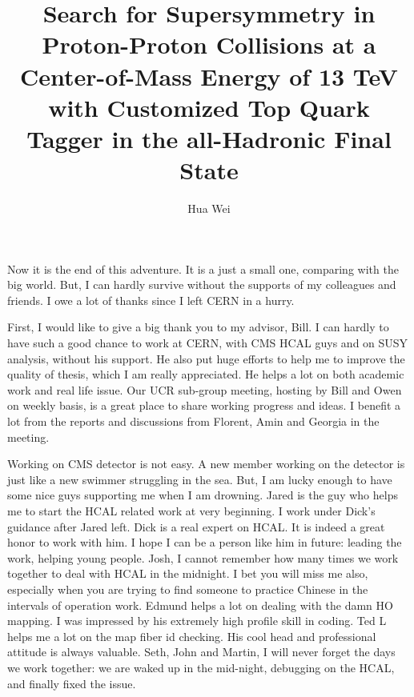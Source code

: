 \documentclass[oneside,final,letterpaper]{ucr}
\begin{document}

\title{Search for Supersymmetry in Proton-Proton Collisions at a Center-of-Mass Energy of 13 TeV with Customized Top Quark Tagger in the all-Hadronic Final State}
\author{Hua Wei}

\maketitle
\copyrightpage{}
\approvalpage{}

\begin{frontmatter}

\begin{acknowledgements}
Now it is the end of this adventure. It is a just a small one, comparing with the big world. But, I can hardly survive without the supports of my colleagues and friends. I owe a lot of thanks since I left CERN in a hurry. 

First, I would like to give a big thank you to my advisor, Bill. I can hardly to have such a good chance to work at CERN, with CMS HCAL guys and on SUSY analysis, without his support. He also put huge efforts to help me to improve the quality of thesis, which I am really appreciated. He helps a lot on both academic work and real life issue. Our UCR sub-group meeting, hosting by Bill and Owen on weekly basis, is a great place to share working progress and ideas. I benefit a lot from the reports and discussions from Florent, Amin and Georgia in the meeting. 

Working on CMS detector is not easy. A new member working on the detector is just like a new swimmer struggling in the sea. But, I am lucky enough to have some nice guys supporting me when I am drowning. Jared is the guy who helps me to start the HCAL related work at very beginning. I work under Dick's guidance after Jared left. Dick is a real expert on HCAL. It is indeed a great honor to work with him. I hope I can be a person like him in future: leading the work, helping young people. Josh, I cannot remember how many times we work together to deal with HCAL in the midnight. I bet you will miss me also, especially when you are trying to find someone to practice Chinese in the intervals of operation work. Edmund helps a lot on dealing with the damn HO mapping. I was impressed by his extremely high profile skill in coding. Ted L helps me a lot on the map fiber id checking. His cool head and professional attitude is always valuable. Seth, John and Martin, I will never forget the days we work together: we are waked up in the mid-night, debugging on the HCAL, and finally fixed the issue. 


\end{acknowledgements}
\end{frontmatter}
\end{document}
